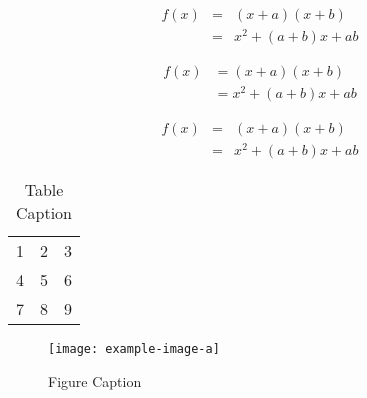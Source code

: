 \documentclass[preprint,12pt,authoryear]{elsarticle}
\begin{document}
\begin{eqnarray}
 f(x) &=& (x+a)(x+b) \nonumber\\ %
      &=& x^2 + (a+b)x + ab
\end{eqnarray}

\begin{align*}
 f(x) &= (x+a)(x+b) \\
      &= x^2 + (a+b)x + ab
\end{align*}

\begin{eqnarray*}
 f(x)&=& (x+a)(x+b) \\
     &=& x^2 + (a+b)x + ab
\end{eqnarray*}


\begin{table}[t]%
\centering%
\begin{tabular}{l c r}%
  1 & 2 & 3 \\ %
  4 & 5 & 6 \\
  7 & 8 & 9 \\
\end{tabular}
\caption{Table Caption}\label{fig1}
\end{table}


\begin{figure}[t]%
\centering%
\texttt{[image: example-image-a]}
\caption{Figure Caption}\label{fig1}
\end{figure}
\end{document}
